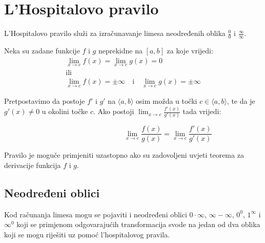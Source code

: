 \section{L'Hospitalovo pravilo}

L'Hospitalovo pravilo služi za izračunavanje limesa neodređenih oblika $\frac{0}{0}$
i $\frac{\infty}{\infty}$.

\begin{definitionbox}
    Neka su zadane funkcije $f$ i $g$ neprekidne na $[a,b]$ za koje vrijedi:
    \begin{gather*}
        \lim_{x\to c}f(x) = \lim_{x\to c}g(x) = 0\\
        \text{ili}\\
        \lim_{x\to c}f(x) = \pm\infty\quad\text{i}\quad\lim_{x\to c}g(x)=\pm\infty
    \end{gather*}

    Pretpostavimo da postoje $f'$ i $g'$ na $\langle a,b\rangle$ osim možda u točki $c\in\langle a,b\rangle$,
    te da je $g'(x)\neq 0$ u okolini točke $c$. Ako postoji $\lim_{x\to c}\frac{f'(x)}{g'(x)}$ tada vrijedi:

    \center
    \begin{equation}
        \label{eq:lhospital}
        \tag{l'hospitalovo pravilo}
        \phantom{\text{(l'hospitalovo pravilo)}} %
        \lim_{x\to c}\frac{f(x)}{g(x)} = \lim_{x\to c}\frac{f'(x)}{g'(x)}
    \end{equation}
\end{definitionbox}

Pravilo je moguče primjeniti uzastopno ako su zadovoljeni uvjeti teorema za
derivacije funkcija $f$ i $g$.

\subsection{Neodređeni oblici}

Kod računanja limesa mogu se pojaviti i neodređeni oblici $0\cdot\infty$, $\infty - \infty$,
$0^0$, $1^\infty$ i $\infty^0$ koji se primjenom odgovarajućih transformacija svode na
jedan od dva oblika koji se mogu riješiti uz pomoć l'hospitalovog pravila.


